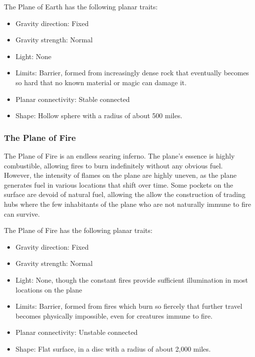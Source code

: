         The Plane of Earth has the following planar traits:
        \begin{itemize}
            \item Gravity direction: Fixed
            \item Gravity strength: Normal
            \item Light: None
            \item Limits: Barrier, formed from increasingly dense rock that eventually becomes so hard that no known material or magic can damage it.
            \item Planar connectivity: Stable connected
            \item Shape: Hollow sphere with a radius of about 500 miles.
        \end{itemize}

        \subsubsection{The Plane of Fire}
        The Plane of Fire is an endless searing inferno.
        The plane's essence is highly combustible, allowing fires to burn indefinitely without any obvious fuel.
        However, the intensity of flames on the plane are highly uneven, as the plane generates fuel in various locations that shift over time.
        Some pockets on the surface are devoid of natural fuel, allowing the allow the construction of trading hubs where the few inhabitants of the plane who are not naturally immune to fire can survive.

        The Plane of Fire has the following planar traits:
        \begin{itemize}
            \item Gravity direction: Fixed
            \item Gravity strength: Normal
            \item Light: None, though the constant fires provide sufficient illumination in most locations on the plane
            \item Limits: Barrier, formed from fires which burn so fiercely that further travel becomes physically impossible, even for creatures immune to fire.
            \item Planar connectivity: Unstable connected
            \item Shape: Flat surface, in a disc with a radius of about 2,000 miles.
        \end{itemize}

